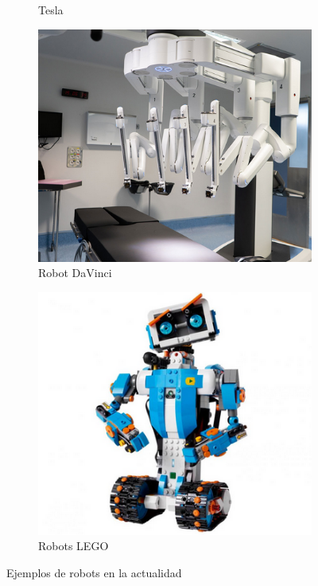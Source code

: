 \begin{figure}[!h]
\begin{subfigure}[b]{0.3\textwidth}
    \caption{Tesla}
  \end{subfigure}
        \hfill
  \begin{subfigure}[b]{0.3\textwidth}
    \includegraphics[width=\textwidth, height=\textwidth]{davinci.png}
    \caption{Robot DaVinci}
  \end{subfigure}
        \hfill
  \begin{subfigure}[b]{0.3\textwidth}
    \includegraphics[width=\textwidth, height=\textwidth]{lego.png}
    \caption{Robots LEGO}
  \end{subfigure}
\caption{Ejemplos de robots en la actualidad}
\label{fig:EjemplosRobots}
\end{figure}


